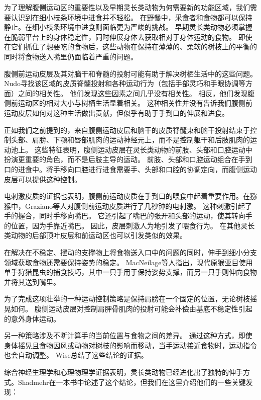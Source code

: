 为了理解腹侧运动区的重要性以及早期灵长类动物为何需要新的功能区域，我们需要认识到在细小枝条环境中进食并不轻松。
在野餐中，采食者和食物都可以保持静止。在细小枝条环境中进食则面临更为严峻的挑战。
早期灵长类动物必须掌握在脆弱平台上的身体稳定性，同时伸展身体去获取相对于身体运动的食物。
即使在它们抓住了想要吃的食物后，这些动物在保持在薄薄的、柔软的树枝上的平衡的同时将食物送入嘴里仍面临着严重的问题。


腹侧前运动皮层及其对脑干和脊髓的投射可能有助于解决树栖生活中的这些问题。
Nudo\cite{nudo1990descending}寻找该区域的皮质脊髓投射和各种运动行为（包括手部灵巧和手眼协调等方面）之间的相关性。
他们发现这些因素之间几乎没有相关性。
相反，他们发现腹侧前运动区的相对大小与树栖生活显着相关。
这种相关性并没有告诉我们腹侧前运动皮层如何对这种生活做出贡献，但似乎有助于手到口的伸展和进食。


正如我们之前提到的，来自腹侧运动皮层和脑干的皮质脊髓束和脑干投射结束于控制头部、肩膀、下颚和唇部肌肉的运动神经元上，而不是控制躯干和后肢肌肉的运动池上。
这些特征表明，腹侧运动皮层在灵长类动物的前肢、头部和口腔运动中扮演更重要的角色，而不是后肢主导的运动。
前肢、头部和口腔运动组合在手到口的进食中。将手移向口腔进行进食需要手、头部和口腔的协调定向，而腹侧运动皮层可以提供这种控制\cite{preuss1993role}。


电刺激皮质的证据也表明，腹侧前运动皮质在手到口的喂食中起着重要作用。在猕猴中，Graziano等人\cite{graziano2002cortical}对腹侧前运动皮质进行了几秒钟的电刺激。
这种刺激引起了手的握合，同时手移向嘴巴。
它还引起了嘴巴的张开和头部的运动，使其转向手的位置，因为手靠近嘴巴。
因此，皮层刺激人为地引发了喂食行为。
在其他灵长类动物的后部顶叶皮层和前运动区也可以引发类似的效果\cite{stepniewska2009organization,gharbawie2010thalamocortical}。


在解决在不稳定、摆动的支撑物上将食物送入口中的问题的同时，伸手到细小分支领域获取食物还需要保持姿势的稳定。
MacNeilage等人\cite{macneilage1987primate}指出，现代原猴亚目使用单手狩猎昆虫的捕食技巧，其中一只手用于保持姿势支撑，而另一只手则伸向食物并将其送到嘴里。


为了完成这项壮举的一种运动控制策略是保持肩膀在一个固定的位置，无论树枝摇晃如何。
腹侧运动皮层对控制肩胛骨肌肉的投射可能会补偿由基底不稳定性引起的意外身体运动。


另一种策略涉及不断计算手的当前位置与食物之间的差异。
通过这种方式，即使身体摇晃且食物因风或动物对树枝的影响而移动，当手运动接近食物时，运动指令也会自动调整。
Wise\cite{wise2007evolution}总结了这些结论的证据。


综合神经生理学和心理物理学证据表明，灵长类动物已经进化出了独特的伸手方式。Shadmehr\cite{shadmehr2004computational}在一本书中论述了这个结论，但我们在这里介绍他们的一些关键发现：\par


